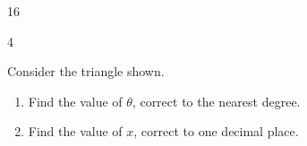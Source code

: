 \documentclass[12pt]{extarticle}    %
\begin{document}
\begin{shortanswer}
\begin{bookletquestion}{16}
\begin{enumerate}
    \questionend                %
    \vspace{2cm}                %
    
\end{enumerate}                 %

\end{bookletquestion}           %

\pagebreak 

\begin{shortquestion}{4}        %

Consider the triangle shown.
\begin{enumerate}               %
    \item{} Find the value of $\theta$, correct to the nearest degree.
    \item{} Find the value of $x$, correct to one decimal place.
\end{enumerate}

\end{shortquestion}             %
    
\end{shortanswer}               %

\pagebreak
\blanklinedpage                 %
\pagebreak
\blankpage                      %
\end{document}
